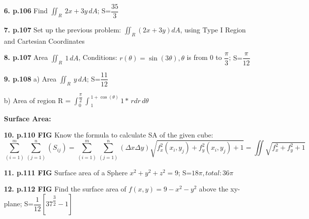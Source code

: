 \documentclass{article}
\begin{document}
\vspace{5mm}
\textbf{6. p.106} Find \displaystyle $\iint_R \ 2x+3y \,dA$; {\color{blue} S=$\dfrac{35}{3}$}

\vspace{5mm}
\textbf{7. p.107} Set up the previous problem: \displaystyle $\iint_R (2x+3y)dA$, using Type I Region and Cartesian Coordinates


\vspace{5mm}
\textbf{8. p.107} Area \displaystyle $\iint_R \ 1 \,dA$,
    Conditions: $r(\theta)=\sin(3\theta), \theta$ is from 0 to $\dfrac{\pi}{3}$;
    {\color{blue} S=$\dfrac{\pi}{12}$}


\vspace{5mm}
\textbf{9. p.108} a) Area {\displaystyle $\iint_R \ y \,dA$}; {\color{blue} S=$\dfrac{11}{12}$}

b) Area of region R = $\int_{0}^{\dfrac{\pi}{2}} \int_{\ 1}^{\ 1+\cos(\theta)}1* \,rdr\,d\theta$

\vspace{15mm}
{\Large \textbf{Surface Area:}}

\vspace{5mm}
\textbf{10. p.110 FIG} Know the formula to calculate SA of the given cube: $$\sum \limits_{(i=1)}^m \sum \limits_{(j=1)}^n (S_{ij}) = \sum \limits_{(i=1)}^m \sum \limits_{(j=1)}^n (\Delta x \Delta y) \sqrt{f_x^2(x_i,y_j)+f_y^2(x_i,y_j)+1} = \iint \sqrt{f_x^2+f_y^2+1}$$

\vspace{5mm}
\textbf{11. p.111 FIG} Surface area of a Sphere \(x^2+y^2+z^2=9\); {\color{blue} S=$18\pi, total:36\pi$}

\vspace{5mm}
\textbf{12. p.112 FIG} Find the surface area of \(f(x,y)=9-x^2-y^2\) above the xy-plane; {\color{blue} S=$\dfrac{1}{12}[37^{\dfrac{3}{2}}-1]$}
\end{document}

